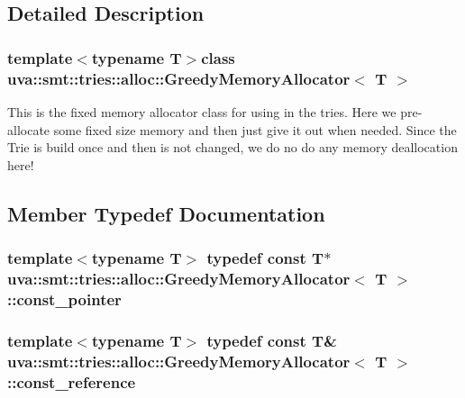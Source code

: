 \subsection{Detailed Description}
\subsubsection*{template$<$typename T$>$class uva\+::smt\+::tries\+::alloc\+::\+Greedy\+Memory\+Allocator$<$ T $>$}

This is the fixed memory allocator class for using in the tries. Here we pre-\/allocate some fixed size memory and then just give it out when needed. Since the Trie is build once and then is not changed, we do no do any memory deallocation here! 

\subsection{Member Typedef Documentation}
\hypertarget{classuva_1_1smt_1_1tries_1_1alloc_1_1_greedy_memory_allocator_aaa55b155c72c0817936b86c9c11a6ab2}{}
\subsubsection[{const\+\_\+pointer}]{\setlength{\rightskip}{0pt plus 5cm}template$<$typename T$>$ typedef const T$\ast$ {\bf uva\+::smt\+::tries\+::alloc\+::\+Greedy\+Memory\+Allocator}$<$ T $>$\+::{\bf const\+\_\+pointer}}\label{classuva_1_1smt_1_1tries_1_1alloc_1_1_greedy_memory_allocator_aaa55b155c72c0817936b86c9c11a6ab2}
\hypertarget{classuva_1_1smt_1_1tries_1_1alloc_1_1_greedy_memory_allocator_a1f74969c0895bf669864b2b28e675386}{}
\subsubsection[{const\+\_\+reference}]{\setlength{\rightskip}{0pt plus 5cm}template$<$typename T$>$ typedef const T\& {\bf uva\+::smt\+::tries\+::alloc\+::\+Greedy\+Memory\+Allocator}$<$ T $>$\+::{\bf const\+\_\+reference}}\label{classuva_1_1smt_1_1tries_1_1alloc_1_1_greedy_memory_allocator_a1f74969c0895bf669864b2b28e675386}
\hypertarget{classuva_1_1smt_1_1tries_1_1alloc_1_1_greedy_memory_allocator_a14467f640838b0667457750468f433cc}{}
